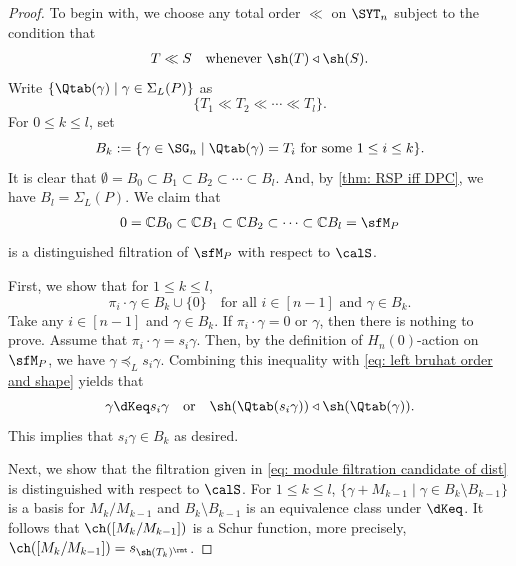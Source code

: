\documentclass[12pt, reqno]{amsart}
\theoremstyle{definition}
\numberwithin{equation}{section} \numberwithin{figure}{section}
\numberwithin{table}{section}
\def\C{\mathbb C}
\begin{document}
\begin{proof}
To begin with, we choose any total order  $\ll$ on $\SYT_n$ subject to the condition that
\begin{align}\label{eq: total order condition}
T \ll S \quad \text{whenever $\sh(T) \triangleleft \sh(S)$.}
\end{align}
Write $\{\Qtab(\gamma) \mid \gamma \in \Sigma_L(P) \}$ as
\[
 \{T_1 \ll T_2 \ll \cdots \ll T_l \}.
\]
For $0 \leq k \leq l$, set 
\[
B_k := \{\gamma \in  \SG_n \mid \Qtab(\gamma) = T_i \  \text{for some $1 \leq i \leq k$}\}.
\]
It is clear that $\emptyset = B_0 \subset B_1 \subset B_2 \subset \cdots \subset B_l$.
And, by \cref{thm: RSP iff DPC}, we have $B_l = \Sigma_L(P)$.
We claim that 
\begin{align}\label{eq: module filtration candidate of dist}
0 = \C B_0 \subset \C B_1 \subset \C B_2 \subset \cdots \subset \C B_l = \sfM_{P}
\end{align}
is a distinguished filtration of $\sfM_P$ with respect to $\calS$.

First, we show that for $1 \leq k \leq l$, 
\[
\pi_i \cdot \gamma \in  B_k \cup \{0\}
\quad \text{for all $i \in [n-1]$ and $\gamma \in B_k$.}
\]
Take any $i \in [n-1]$ and $\gamma \in B_k$.
If $\pi_i \cdot \gamma = 0$ or $\gamma$, then there is nothing to prove.
Assume that $\pi_i \cdot \gamma = s_i \gamma$.
Then, by the definition of $H_n(0)$-action on $\sfM_P$, we have $\gamma \preceq_L s_i \gamma$.
Combining this inequality with \cref{eq: left bruhat order and shape} yields that 
\[
\gamma \dKeq s_i \gamma
\quad \text{or} \quad
\sh(\Qtab(s_i \gamma)) \triangleleft \sh(\Qtab(\gamma)).
\]
This implies that $s_i \gamma \in B_k$ as desired.

Next, we show that the filtration given in \cref{eq: module filtration candidate of dist}
is distinguished with respect to $\calS$.
For $1 \le k \le l$, $\{\gamma + M_{k-1} \mid \gamma \in B_k \setminus B_{k-1}\}$ is a basis for $M_k / M_{k-1}$ and $B_k \setminus B_{k-1}$ is an equivalence class under $\dKeq$.
It follows that $\ch([M_k / M_{k-1}])$ is a Schur function, more precisely, $\ch([M_k / M_{k-1}]) = s_{\sh(T_k)^\rmt}$.
\end{proof}
\end{document}
